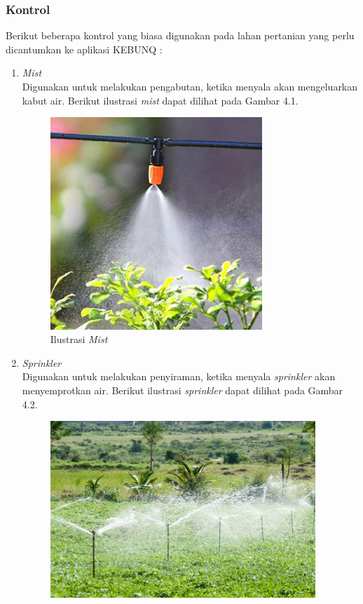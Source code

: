 \begin{flushleft}
\begin{justify}
        \subsubsection{Kontrol}
        Berikut beberapa kontrol yang biasa digunakan pada lahan pertanian yang perlu dicantumkan ke aplikasi KEBUNQ :
        \begin{enumerate}
            \item \emph{Mist} 
            \\Digunakan untuk melakukan pengabutan, ketika menyala akan mengeluarkan kabut air. 
            Berikut ilustrasi \emph{mist} dapat dilihat pada Gambar 4.1.\\
            \begin{figure}[ht]
                \centering
                \includegraphics[width=8cm]{images/bab 4/gambar_mist.png}
                \caption{Ilustrasi \textit{Mist}}
            \end{figure}
            \item \emph{Sprinkler} 
            \\Digunakan untuk melakukan penyiraman, ketika menyala \emph{sprinkler} akan menyemprotkan air.
            Berikut ilustrasi \emph{sprinkler} dapat dilihat pada Gambar 4.2.
            \begin{figure}[ht]
                \centering
                \includegraphics[width=10cm]{images/bab 4/gambar_sprinkler.png}

\end{figure}
\end{enumerate}
\end{justify}
\end{flushleft}
